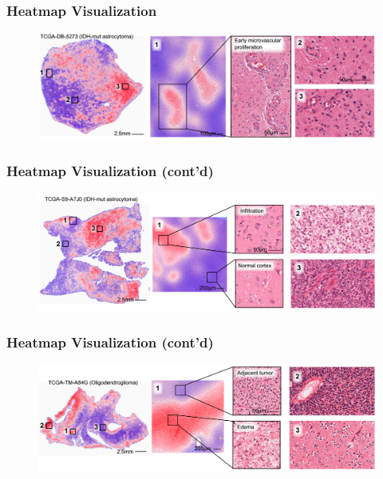 \documentclass[usenames,dvipsnames]{beamer}
\begin{document}
\begin{frame}
  \frametitle{Heatmap Visualization}
  \begin{figure}[ht]
    \centering
    \includegraphics[width=1.0\textwidth]{figures/heatmap1.png}
    \caption*{\label{fig:heatmap1}}
  \end{figure}
\end{frame}
\begin{frame}
  \frametitle{Heatmap Visualization (cont'd)}
  \begin{figure}[ht]
    \centering
    \includegraphics[width=1.0\textwidth]{figures/heatmap2.png}
    \caption*{\label{fig:heatmap3}}
  \end{figure}
\end{frame}
\begin{frame}
  \frametitle{Heatmap Visualization (cont'd)}
  \begin{figure}[ht]
    \centering
    \includegraphics[width=1.0\textwidth]{figures/heatmap3.png}
    \caption*{\label{fig:heatmap3}}
  \end{figure}
\end{frame}
\end{document}
